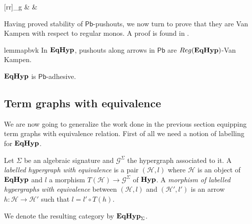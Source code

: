 \documentclass[a4paper,UKenglish,cleveref,pdftex,thm-restate,numberwithinsect]{lipics-v2021}
\newcommand{\pbc}{\mathsf{Pb}}
\newcommand{\catname}[1]{\textbf{\textup{#1}}}
\newcommand{\hyp}{\catname{Hyp}}
\newcommand{\EqHyp}{\catname{EqHyp}} %
\newcommand{\reg}{\mathsf{Reg}}
\begin{document}
\begin{example}
\begin{minipage}[r]{.60\linewidth}
{                \ar@{>->}[rr]_{g} & & 
                 }
  \end{minipage}
\end{example}


Having proved stability of $\pbc$-pushouts, we now turn to prove that they are Van Kampen with respect to regular monos.
%
A proof is found in .

\begin{restatable}{lemma}{pbvk}\label{lemma:van_kampen}
	In $\EqHyp$, pushouts along arrows in $\pbc$ are $\reg(\EqHyp)$-Van Kampen.
\end{restatable}

\begin{corollary}\label{cor:eqade}
	$\EqHyp$ is $\pbc$-adhesive.
\end{corollary}

%
%

\subsection{Term graphs with equivalence}


We are now going to generalize the work done in the previous section equipping term graphs with equivalence relation. First of all we need a notion of labelling for $\EqHyp$. 

\begin{definition}
	Let $\Sigma$ be an algebraic signature and $\mathcal{G}^{\Sigma}$ the hypergraph associated to it. A \emph{labelled hypergraph with equivalence} is a pair $(\mathcal{H}, l)$ where $\mathcal{H}$ is an object of $\EqHyp$ and $l$ a morphism $T(\mathcal{H})\to \mathcal{G}^\Sigma$ of $\hyp$. A \emph{morphism of labelled hypergraphs with equivalence} between $(\mathcal{H}, l)$ and $(\mathcal{H}', l')$ is an arrow $h\colon \mathcal{H}\to \mathcal{H}'$ such that $l= l'\circ T(h)$.
	
	We denote the resulting category by $\EqHyp_\Sigma$.
\end{definition}
\end{document}
